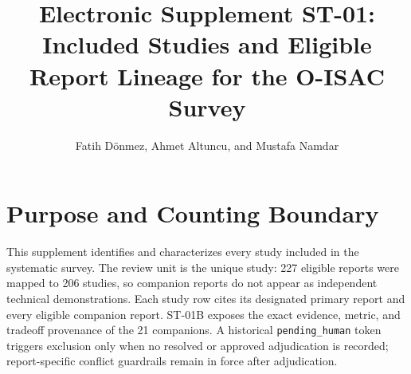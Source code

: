 \documentclass[onecolumn,journal,oneside]{IEEEtran}
\begin{document}
\title{Electronic Supplement ST-01: Included Studies and Eligible Report
Lineage for the O-ISAC Survey}

\author{Fatih D\"onmez, Ahmet Altuncu, and Mustafa Namdar}

\maketitle

\section*{Purpose and Counting Boundary}

This supplement identifies and characterizes every study included in the
systematic survey. The review unit is the unique study: 227 eligible reports
were mapped to 206 studies, so companion reports do not appear as independent
technical demonstrations. Each study row cites its designated primary report
and every eligible companion report. ST-01B exposes the exact evidence,
metric, and tradeoff provenance of the 21 companions. A historical
\texttt{pending\_human} token triggers exclusion only when no resolved or
approved adjudication is recorded; report-specific conflict guardrails remain
in force after adjudication.

\begin{landscape}
\begingroup
\footnotesize
\sloppy
\setlength{\tabcolsep}{3pt}
\renewcommand{\arraystretch}{1.02}

\clearpage

\endgroup
\end{landscape}



\end{document}
